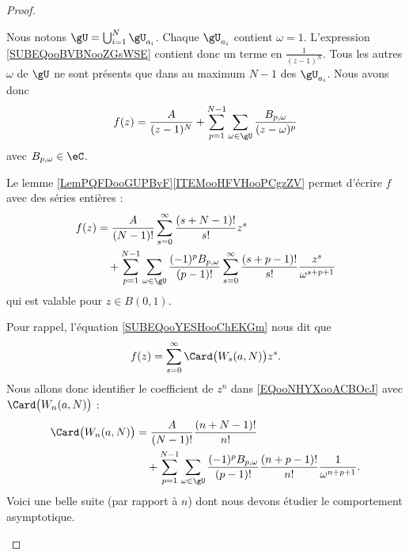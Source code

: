 \begin{proof}
\begin{subproof}
		\spitem[Isoler le terme \( \omega=1\)]
		Nous notons \( \gU=\bigcup_{i=1}^N\gU_{a_i}\). Chaque \( \gU_{a_i}\) contient \( \omega=1\). L'expression \eqref{SUBEQooBVBNooZGsWSE} contient donc un terme en \( \frac{1}{ (z-1)^N }\). Tous les autres \( \omega\) de \( \gU\) ne sont présents que dans au maximum \( N-1\) des \( \gU_{a_i}\). Nous avons donc
		\begin{equation}        \label{EQooUUEPooQrVASA}
			f(z)=\frac{ A }{ (z-1)^N }+\sum_{p=1}^{N-1}\sum_{\omega\in \gU}\frac{ B_{p,\omega} }{ (z-\omega)^p }
		\end{equation}
		avec \( B_{p,\omega}\in \eC\).

		Le lemme \ref{LemPQFDooGUPBvF}\ref{ITEMooHFVHooPCgzZV} permet d'écrire \( f\) avec des séries entières :
		\begin{equation}        \label{EQooNHYXooACBOcJ}
			\begin{aligned}[]
				f(z) & =  \frac{A}{ (N-1)! }\sum_{s=0}^{\infty}\frac{ (s+N-1)! }{ s! }z^s                                                                                    \\
				     & \quad+\sum_{p=1}^{N-1}\sum_{\omega\in \gU}\frac{(-1)^pB_{p,\omega}}{ (p-1)! }\sum_{s=0}^{\infty}\frac{ (s+p-1)! }{ s! }\frac{ z^s }{ \omega^{s+p+1} }
			\end{aligned}
		\end{equation}
		qui est valable pour \( z\in B(0,1)\).

		\spitem[Ce qu'on en fait]
		Pour rappel, l'équation \eqref{SUBEQooYESHooChEKGm} nous dit que
		\begin{equation}
			f(z)=\sum_{s=0}^{\infty}\Card\big( W_s(a,N) \big)z^s.
		\end{equation}
		Nous allons donc identifier le coefficient de \( z^n\) dans \eqref{EQooNHYXooACBOcJ} avec \( \Card\big( W_n(a,N) \big)\) :
		\begin{equation}
			\begin{aligned}[]
				\Card\big( W_n(a,N) \big) & =\frac{ A }{ (N-1)! }\frac{ (n+N-1)! }{ n! }                                                                                        \\
				                          & \quad+\sum_{p=1}^{N-1}\sum_{\omega\in \gU}\frac{ (-1)^{p}B_{p,\omega} }{ (p-1)! }\frac{ (n+p-1)! }{ n! }\frac{1}{ \omega^{n+p+1} }.
			\end{aligned}
		\end{equation}
		Voici une belle suite (par rapport à \( n\)) dont nous devons étudier le comportement asymptotique.


\end{subproof}
\end{proof}
